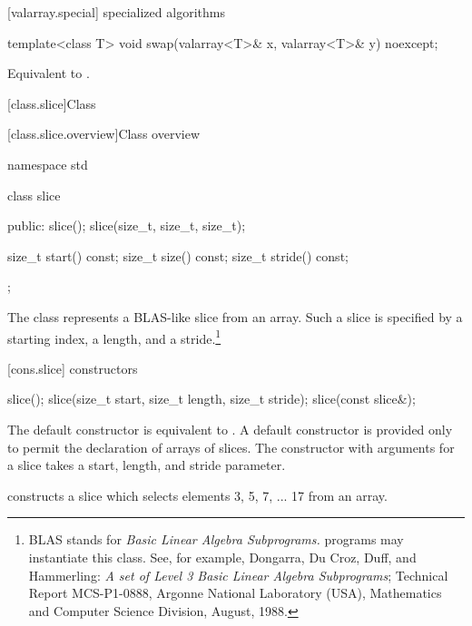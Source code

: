 [valarray.special]{ specialized algorithms}

%
\begin{itemdecl}
template<class T> void swap(valarray<T>& x, valarray<T>& y) noexcept;
\end{itemdecl}

\begin{itemdescr}
\pnum
\effects Equivalent to .
\end{itemdescr}


[class.slice]{Class }

[class.slice.overview]{Class  overview}

%
\begin{codeblock}
namespace std {
  class slice {
  public:
    slice();
    slice(size_t, size_t, size_t);

    size_t start() const;
    size_t size() const;
    size_t stride() const;
  };
}
\end{codeblock}

\pnum
The 
class represents a BLAS-like slice from an array.
Such a slice is specified by a starting index, a length, and a
stride.\footnote{BLAS stands for
\textit{Basic Linear Algebra Subprograms.}
\Cpp{} programs may instantiate this class.
See, for example,
Dongarra, Du Croz, Duff, and Hammerling:
\textit{A set of Level 3 Basic Linear Algebra Subprograms};
Technical Report MCS-P1-0888,
Argonne National Laboratory (USA),
Mathematics and Computer Science Division,
August, 1988.}

[cons.slice]{ constructors}

%
\begin{itemdecl}
slice();
slice(size_t start, size_t length, size_t stride);
slice(const slice&);
\end{itemdecl}

\begin{itemdescr}
\pnum
The default constructor is equivalent to .
A default constructor is provided only to permit the declaration of arrays of slices.
The constructor with arguments for a slice takes a start, length, and stride
parameter.

\pnum
\begin{example}
constructs a slice which selects elements 3, 5, 7, ... 17 from an array.
\end{example}
\end{itemdescr}

